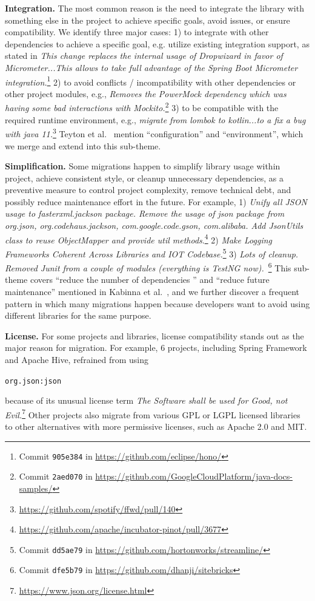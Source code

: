 \documentclass[sigconf, screen]{acmart}
\newcommand{\Code}[1]{\begin{small}\texttt{#1}\end{small}}
\begin{document}
\textbf{Integration.} 
The most common reason is the need to integrate the library with something else in the project to achieve specific goals, avoid issues, or ensure compatibility.
We identify three major cases: 
1) to integrate with other dependencies to achieve a specific goal, e.g. utilize existing integration support, as stated in \textit{This change replaces the internal usage of Dropwizard in favor of Micrometer...This allows to take full advantage of the Spring Boot Micrometer integration.}\footnote{Commit \texttt{905e384} in \url{https://github.com/eclipse/hono/}}
2) to avoid conflicts / incompatibility with other dependencies or other project modules, e.g., \textit{Removes the PowerMock dependency which was having some bad interactions with Mockito.}\footnote{Commit \texttt{2aed070} in \url{https://github.com/GoogleCloudPlatform/java-docs-samples/}} 
3) to be compatible with the required runtime environment, e.g., \textit{migrate from lombok to kotlin...to a fix a bug with java 11.}\footnote{\url{https://github.com/spotify/ffwd/pull/140}}
Teyton et al.~\cite{teyton2014study} mention ``configuration'' and ``environment'', which we merge and extend into this sub-theme.

\textbf{Simplification.} 
Some migrations happen to simplify library usage within project, achieve consistent style, or cleanup unnecessary dependencies, as a preventive measure to control project complexity, remove technical debt, and possibly reduce maintenance effort in the future. 
For example, 1) \textit{Unify all JSON usage to fasterxml.jackson package. Remove the usage of json package from org.json, org.codehaus.jackson, com.google.code.gson, com.alibaba. Add JsonUtils class to reuse ObjectMapper and provide util methods}.\footnote{\url{https://github.com/apache/incubator-pinot/pull/3677}}
2) \textit{Make Logging Frameworks Coherent Across Libraries and IOT Codebase.}\footnote{Commit \texttt{dd5ae79} in \url{https://github.com/hortonworks/streamline/}}
3) \textit{Lots of cleanup. Removed Junit from a couple of modules (everything is TestNG now).}~\footnote{Commit \texttt{dfe5b79} in \url{https://github.com/dhanji/sitebricks}}
This sub-theme covers ``reduce the number of dependencies '' and ``reduce future maintenance'' mentioned in Kabinna et al.~\cite{kabinna2016logging}, and we further discover a frequent pattern in which many migrations happen because developers want to avoid using different libraries for the same purpose.

\textbf{License.}
For some projects and libraries, license compatibility stands out as the major reason for migration.
For example, 6 projects, including Spring Framework and Apache Hive, refrained from using \Code{org.json:json} because of its unusual license term \textit{The Software shall be used for Good, not Evil.}\footnote{\url{https://www.json.org/license.html}}
Other projects also migrate from various GPL or LGPL licensed libraries to other alternatives with more permissive licenses, such as Apache 2.0 and MIT.
\end{document}
